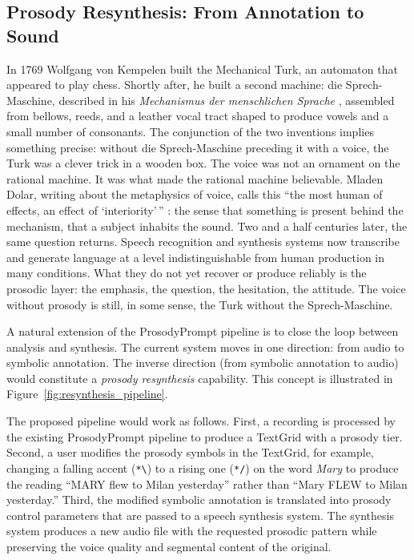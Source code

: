 \subsection{Prosody Resynthesis: From Annotation to Sound}
\label{sec:resynthesis}

In 1769 Wolfgang von Kempelen built the Mechanical Turk, an automaton that
appeared to play chess. Shortly after, he built a second machine: die
Sprech-Maschine, described in his \textit{Mechanismus der menschlichen
Sprache} \cite{kempelen1791}, assembled from bellows, reeds, and a leather
vocal tract shaped to produce vowels and a small number of consonants. The
conjunction of the two inventions implies something precise: without die
Sprech-Maschine preceding it with a voice, the Turk was a clever trick in
a wooden box. The voice was not an ornament on the rational machine. It was
what made the rational machine believable. Mladen Dolar, writing about the
metaphysics of voice, calls this ``the most human of effects, an effect of
`interiority'\,'' \cite[10]{dolar2006}: the sense that something is present
behind the mechanism, that a subject inhabits the sound. Two and a half
centuries later, the same question returns. Speech recognition and synthesis
systems now transcribe and generate language at a level indistinguishable
from human production in many conditions. What they do not yet recover or
produce reliably is the prosodic layer: the emphasis, the question, the
hesitation, the attitude. The voice without prosody is still, in some sense,
the Turk without the Sprech-Maschine.

A natural extension of the ProsodyPrompt pipeline is to close the loop between
analysis and synthesis. The current system moves in one direction: from audio
to symbolic annotation. The inverse direction (from symbolic annotation to
audio) would constitute a \emph{prosody resynthesis} capability. This concept
is illustrated in Figure~\ref{fig:resynthesis_pipeline}.

The proposed pipeline would work as follows. First, a recording is processed by
the existing ProsodyPrompt pipeline to produce a TextGrid with a prosody tier.
Second, a user modifies the prosody symbols in the TextGrid, for example,
changing a falling accent (\texttt{*\textbackslash}) to a rising one
(\texttt{*/}) on the word \textit{Mary} to produce the reading ``MARY flew to
Milan yesterday'' rather than ``Mary FLEW to Milan yesterday.'' Third, the
modified symbolic annotation is translated into prosody control parameters that
are passed to a speech synthesis system. The synthesis system produces a new
audio file with the requested prosodic pattern while preserving the voice quality
and segmental content of the original.


